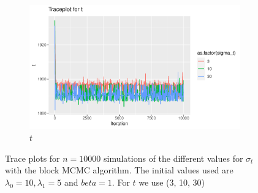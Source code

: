 \begin{figure}[H]
\begin{subfigure}[b]{0.49\textwidth}
    \end{subfigure}
    \begin{subfigure}[b]{0.49\textwidth}
        \centering
        \includegraphics[width = \textwidth]{Images/tuning_t_block.pdf}
        \caption{$t$}

    \end{subfigure}
    \caption{Trace plots for $n = 10000$ simulations of the different values for $\sigma_t$ with the block MCMC algorithm. The initial values used are $\lambda_0 = 10, \lambda_1 = 5$ and $beta = 1$. For $t$ we use (3, 10, 30) }
    \label{fig:tuning_t_blockMH}
\end{figure}


